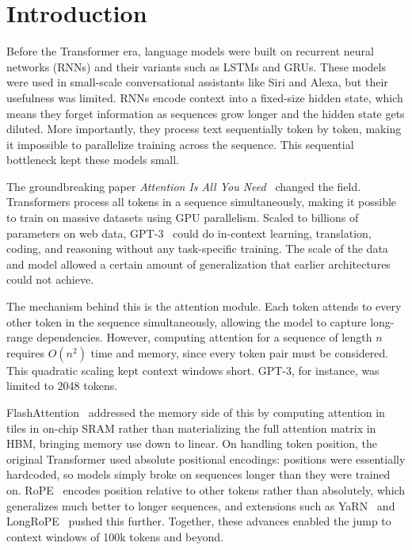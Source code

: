 \section{Introduction}

Before the Transformer era, language models were built on recurrent neural networks (RNNs) and their variants such as LSTMs and GRUs.
These models were used in small-scale conversational assistants like Siri and Alexa, but their usefulness was limited.
RNNs encode context into a fixed-size hidden state, which means they forget information as sequences grow longer and the hidden state gets diluted.
More importantly, they process text sequentially token by token, making it impossible to parallelize training across the sequence.
This sequential bottleneck kept these models small.

The groundbreaking paper \textit{Attention Is All You Need}~\citep{vaswani2017attention} changed the field.
Transformers process all tokens in a sequence simultaneously, making it possible to train on massive datasets using GPU parallelism.
Scaled to billions of parameters on web data, GPT-3~\citep{brown2020gpt3} could do in-context learning, translation, coding, and reasoning without any task-specific training.
The scale of the data and model allowed a certain amount of generalization that earlier architectures could not achieve.

The mechanism behind this is the attention module.
Each token attends to every other token in the sequence simultaneously, allowing the model to capture long-range dependencies. However, computing attention for a sequence of length $n$ requires $O(n^2)$ time and memory, since every token pair must be considered. This quadratic scaling kept context windows short.
GPT-3, for instance, was limited to 2048 tokens.

FlashAttention~\citep{dao2022flashattention} addressed the memory side of this by computing attention in tiles in on-chip SRAM rather than materializing the full attention matrix in HBM, bringing memory use down to linear.
On handling token position, the original Transformer used absolute positional encodings: positions were essentially hardcoded, so models simply broke on sequences longer than they were trained on. RoPE~\citep{su2024rope} encodes position relative to other tokens rather than absolutely, which generalizes much better to longer sequences, and extensions such as YaRN~\citep{peng2023yarn} and LongRoPE~\citep{ding2024longrope} pushed this further. Together, these advances enabled the jump to context windows of 100k tokens and beyond.

